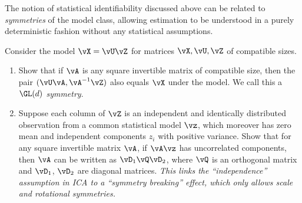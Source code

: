 \documentclass[../../book-main.tex]{subfiles}
\begin{document}
\begin{exercise}\label{exercise:symmetry-identifiability}
    The notion of statistical identifiability discussed above can be
    related to \textit{symmetries} of the model class, allowing
    estimation to be understood in a purely deterministic fashion
    without any statistical assumptions.

    Consider the model $\vX = \vU \vZ$ for matrices $\vX, \vU, \vZ$
    of compatible sizes.
    \begin{enumerate}
        \item Show that if $\vA$ is any square invertible matrix of
            compatible size, then the pair
            $(\vU \vA, \vA^{-1} \vZ)$ also equals $\vX$ under the
            model. We call this a \textit{$\GL(d)$ symmetry}.
        \item Suppose each column of $\vZ$ is an independent and
            identically distributed observation from a common
            statistical model $\vz$, which moreover has zero mean and
            independent components $z_i$ with positive variance.
            Show that for any square invertible matrix $\vA$, if $\vA
            \vz$ has uncorrelated components, then $\vA$ can be
            written as $\vD_1 \vQ \vD_2$, where $\vQ$ is an
            orthogonal matrix and $\vD_1$, $\vD_2$ are diagonal matrices.
            \textit{This links the ``independence'' assumption in ICA
                to a ``symmetry breaking'' effect, which only allows
            scale and rotational symmetries.}
    \end{enumerate}

\end{exercise}
\end{document}

